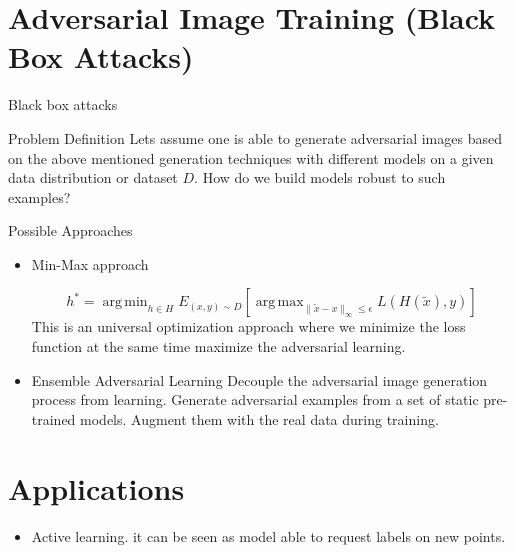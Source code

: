 \documentclass[10pt]{beamer}
\DeclareMathOperator*{\argmax}{arg\,max}
\DeclareMathOperator*{\argmin}{arg\,min}
\begin{document}
\section{Adversarial Image Training   (Black Box Attacks)}
\begin{frame}{Black box attacks}
	\begin{block}{Problem Definition}
		Lets assume one is able to generate adversarial images based on the above mentioned generation techniques with different models on a given data distribution or dataset $\textit{D}$. How do we build models robust to such examples? 
	\end{block}
	
\end{frame}
\begin{frame}{Possible Approaches}
\begin{itemize}
	\item[] {
		\begin{block}{Min-Max approach}
			
			\begin{equation}\label{madry-approach}
				h^* = \argmin_{h \in H} E_{(x,y) \sim D}[ \argmax_{\|\tilde{x} - x\|_{\infty} \leq \epsilon} L(H(\tilde{x}),y)]  
			\end{equation}
			This is an universal optimization approach where we minimize the loss function at the same time maximize the adversarial learning.
		\end{block}
	}
	\item[] {
		\begin{block}{Ensemble Adversarial Learning}
			Decouple the adversarial image generation process from learning. Generate adversarial examples from a set of static pre-trained models. Augment them with the real data during training.
		\end{block}
	}
\end{itemize}
		
	
\end{frame}

\section{Applications}
\begin{frame}
	\begin{itemize}
		\item Active learning. it can be seen as model able to request labels on new points.
	\end{itemize}
\end{frame}
\end{document}

